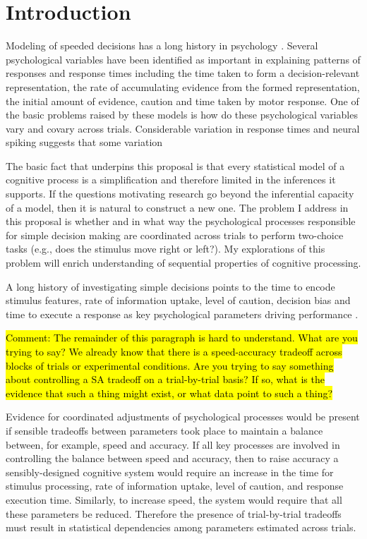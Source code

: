 \documentclass[12pt]{article}
\newcommand{\trish}[1]{\textrm{\hl{#1}}}
\begin{document}
\section{Introduction}
Modeling of speeded decisions has a long history in psychology \citep{Sto1960,Rat1978,TowAsh1983,Luc1986,RatSmi2004}. Several psychological variables have been identified as important in explaining patterns of responses and response times including the time taken to form a decision-relevant representation, the rate of accumulating evidence from the formed representation, the initial amount of evidence, caution and time taken by motor response. One of the basic problems raised by these models is how do these psychological variables vary and covary across trials. Considerable variation in response times and neural spiking suggests that some variation


The basic fact that underpins this proposal is that every statistical model
of a cognitive process is a simplification and therefore
limited in the inferences it supports. If the questions
motivating research go beyond the inferential capacity of a model, then it
is natural to construct a new one. The problem I address in this
proposal is whether and in what way the psychological processes
responsible for simple decision making are coordinated across trials to
perform two-choice tasks (e.g., does the stimulus move right or
left?). My explorations of this problem will enrich understanding
of sequential properties of cognitive processing.

A long history of investigating simple decisions points to the time
to encode stimulus features, rate of information uptake, level of caution,
decision bias and time to execute a response as key psychological
parameters driving performance
 \citep{Sto1960,Vic1979,TowAsh1983,Luc1986,BogBro2006}.  

\trish{Comment:
The remainder of this paragraph is hard to understand.  What are you trying to say?  We already know that there is a speed-accuracy tradeoff across blocks of trials or experimental conditions. Are you trying to say something about controlling a SA tradeoff on a trial-by-trial basis? If so, what is the evidence that such a thing might exist, or what data point to such a thing?}  

Evidence for
coordinated adjustments of psychological processes would be present if
sensible tradeoffs between parameters took place to maintain a
balance between, for example, speed and accuracy.  If all key
processes are involved in controlling the balance between speed and
accuracy, then to raise accuracy a sensibly-designed cognitive system would
require an increase in the time for stimulus processing,
rate of information uptake, level of caution, and response execution time. Similarly, to increase
speed, the system would require that all these parameters be reduced.
Therefore the presence of trial-by-trial tradeoffs must
result in statistical dependencies among parameters estimated
across trials.
\end{document}
